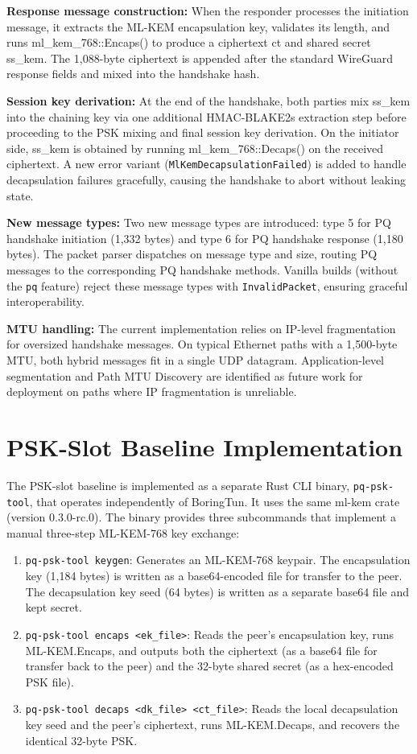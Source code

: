 \textbf{Response message construction:} When the responder processes the initiation message, it extracts the ML-KEM encapsulation key, validates its length, and runs ml\_kem\_768::Encaps() to produce a ciphertext ct and shared secret ss\_kem. The 1,088-byte ciphertext is appended after the standard WireGuard response fields and mixed into the handshake hash.

\textbf{Session key derivation:} At the end of the handshake, both parties mix ss\_kem into the chaining key via one additional HMAC-BLAKE2s extraction step before proceeding to the PSK mixing and final session key derivation. On the initiator side, ss\_kem is obtained by running ml\_kem\_768::Decaps() on the received ciphertext. A new error variant (\texttt{MlKemDecapsulationFailed}) is added to handle decapsulation failures gracefully, causing the handshake to abort without leaking state.

\textbf{New message types:} Two new message types are introduced: type 5 for PQ handshake initiation (1,332 bytes) and type 6 for PQ handshake response (1,180 bytes). The packet parser dispatches on message type and size, routing PQ messages to the corresponding PQ handshake methods. Vanilla builds (without the \texttt{pq} feature) reject these message types with \texttt{InvalidPacket}, ensuring graceful interoperability.

\textbf{MTU handling:} The current implementation relies on IP-level fragmentation for oversized handshake messages. On typical Ethernet paths with a 1,500-byte MTU, both hybrid messages fit in a single UDP datagram. Application-level segmentation and Path MTU Discovery are identified as future work for deployment on paths where IP fragmentation is unreliable.

\section{PSK-Slot Baseline Implementation}

The PSK-slot baseline is implemented as a separate Rust CLI binary, \texttt{pq-psk-tool}, that operates independently of BoringTun. It uses the same ml-kem crate (version 0.3.0-rc.0). The binary provides three subcommands that implement a manual three-step ML-KEM-768 key exchange:

\begin{enumerate}
    \item \texttt{pq-psk-tool keygen}: Generates an ML-KEM-768 keypair. The encapsulation key (1,184 bytes) is written as a base64-encoded file for transfer to the peer. The decapsulation key seed (64 bytes) is written as a separate base64 file and kept secret.
    \item \texttt{pq-psk-tool encaps <ek\_file>}: Reads the peer's encapsulation key, runs ML-KEM.Encaps, and outputs both the ciphertext (as a base64 file for transfer back to the peer) and the 32-byte shared secret (as a hex-encoded PSK file).
    \item \texttt{pq-psk-tool decaps <dk\_file> <ct\_file>}: Reads the local decapsulation key seed and the peer's ciphertext, runs ML-KEM.Decaps, and recovers the identical 32-byte PSK.
\end{enumerate}

